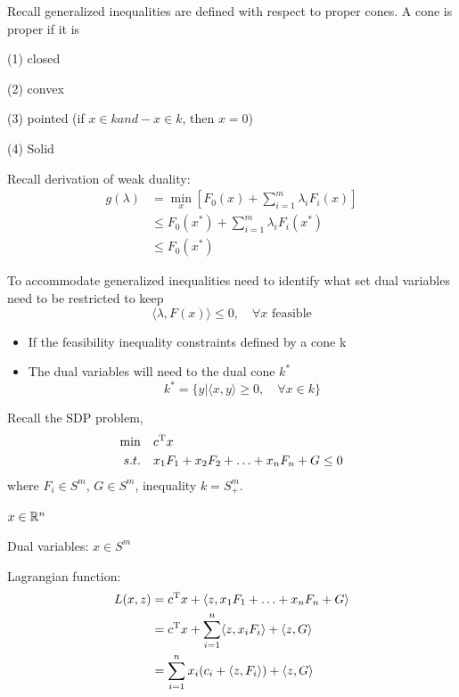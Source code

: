Recall generalized inequalities are defined with respect to proper cones. A cone is proper if it is

	(1) closed
	
	(2) convex
	
	(3) pointed (if $x\in k and -x\in k$, then $x=0$)
	
	(4) Solid





Recall derivation of weak duality:
\begin{align*}
g(\lambda) &= \min_x[F_0(x) + \sum^m_{i=1}\lambda_iF_i(x)]\\
&\leq F_0(x^*) + \sum^m_{i=1}\lambda_i F_i(x^*) \\
&\leq F_0(x^*)
\end{align*}

To accommodate generalized inequalities need to identify what set dual variables need to be restricted to keep
\begin{equation*}
\langle \lambda, F(x)\rangle\leq 0,\quad \forall x \text{ feasible}
\end{equation*}



\begin{itemize}
	\item If the feasibility inequality constraints defined by a cone k
	
	\item The dual variables will need to the dual cone $k^*$
$$k^*=\{y| \langle x,y\rangle \geq 0, \quad \forall x\in k \}$$
\end{itemize}



Recall the SDP problem,
\begin{align*}
\min\quad &c^{{\rm T}}x\\
s.t.\quad &x_1F_1+x_2F_2+\ldots+x_nF_n+G\leq 0
\end{align*}
where $F_i\in S^m$, $G\in S^m$, inequality $k=S^m_+$.


$x\in \mathbb{R}^n$

Dual variables: $x\in S^m$

Lagrangian function:
\begin{align*}
L(x,z) &= c^{{\rm T}}x + \langle z,x_1F_1+\ldots +x_nF_n+G\rangle \\
&= c^{{\rm T}}x + \sum^n_{i=1}\langle z,x_iF_i\rangle+\langle z,G\rangle\\
&= \sum^n_{i=1}x_i(c_i+\langle z, F_i\rangle)+\langle z,G\rangle
\end{align*}


